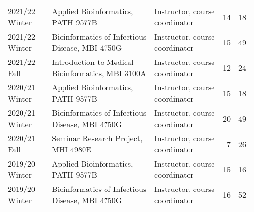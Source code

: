 \begin{tabular}{lp{2.35in}p{1.2in}rr}
2021/22 Winter & Applied Bioinformatics, PATH 9577B & Instructor, course coordinator & 14 & 18\\
2021/22 Winter & Bioinformatics of Infectious Disease, MBI 4750G & Instructor, course coordinator & 15 & 49\\
2021/22 Fall & Introduction to Medical Bioinformatics, MBI 3100A & Instructor, course coordinator & 12 & 24\\

2020/21 Winter & Applied Bioinformatics, PATH 9577B & Instructor, course coordinator & 15 & 18\\
2020/21 Winter & Bioinformatics of Infectious Disease, MBI 4750G & Instructor, course coordinator & 20 & 49\\





 


2020/21 Fall & Seminar Research Project, MHI 4980E & Instructor, course coordinator & 7 & 26\\


2019/20 Winter & Applied Bioinformatics, PATH 9577B & Instructor, course coordinator & 15 & 16\\
2019/20 Winter & Bioinformatics of Infectious Disease, MBI 4750G & Instructor, course coordinator & 16 & 52\\

\hline

\end{tabular}
\egroup